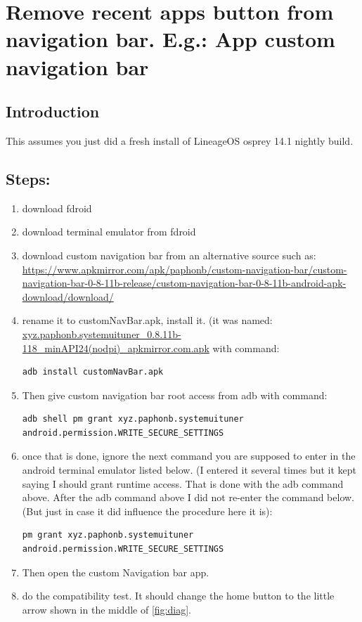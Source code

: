 \section{Remove recent apps button from navigation bar. E.g.:  App custom navigation bar}\label{sec:ch6}
\subsection{Introduction}
This assumes you just did a fresh install of LineageOS osprey 14.1 nightly build.
\subsection{Steps:}
\begin{enumerate}
    \item download fdroid
    \item download terminal emulator from fdroid
    \item download custom navigation bar from an alternative source such as: \url{https://www.apkmirror.com/apk/paphonb/custom-navigation-bar/custom-navigation-bar-0-8-11b-release/custom-navigation-bar-0-8-11b-android-apk-download/download/}
    \item rename it to customNavBar.apk, install it. (it was named: \url{xyz.paphonb.systemuituner_0.8.11b-118_minAPI24(nodpi)_apkmirror.com.apk} with command:
\begin{verbatim}
adb install customNavBar.apk
\end{verbatim}
    \item Then give custom navigation bar root access from adb with command:
\begin{verbatim}
adb shell pm grant xyz.paphonb.systemuituner android.permission.WRITE_SECURE_SETTINGS    
\end{verbatim}
    \item once that is done, ignore the next command you are supposed to enter in the android terminal emulator listed below. (I entered it several times but it kept saying I should grant runtime access. That is done with the adb command above. After the adb command above I did not re-enter the command below. (But just in case it did influence the procedure here it is):
\begin{verbatim}
pm grant xyz.paphonb.systemuituner android.permission.WRITE_SECURE_SETTINGS    
\end{verbatim}
    \item Then open the custom Navigation bar app.
    \item do the compatibility test. It should change the home button to the little arrow shown in the middle of \cref{fig:diag}.
    

\end{enumerate}
